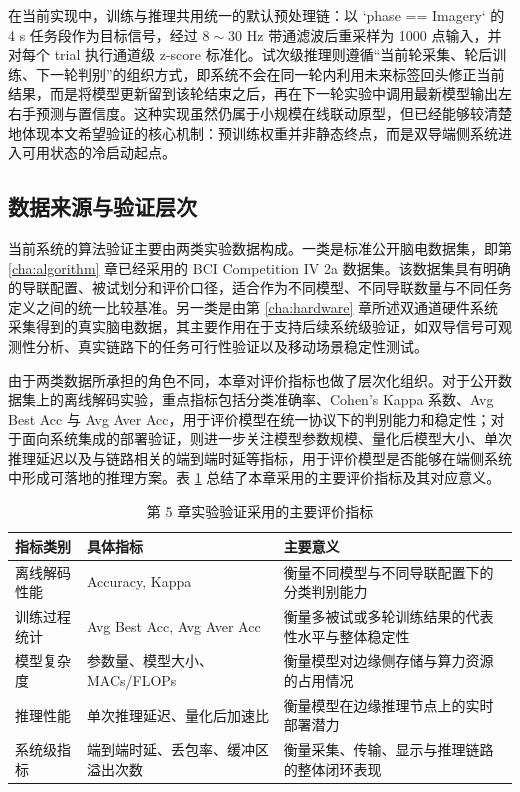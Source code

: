 在当前实现中，训练与推理共用统一的默认预处理链：以 `phase == Imagery` 的 4 s 任务段作为目标信号，经过 $8 \sim 30$ Hz 带通滤波后重采样为 1000 点输入，并对每个 trial 执行通道级 z-score 标准化。试次级推理则遵循“当前轮采集、轮后训练、下一轮判别”的组织方式，即系统不会在同一轮内利用未来标签回头修正当前结果，而是将模型更新留到该轮结束之后，再在下一轮实验中调用最新模型输出左右手预测与置信度。这种实现虽然仍属于小规模在线联动原型，但已经能够较清楚地体现本文希望验证的核心机制：预训练权重并非静态终点，而是双导端侧系统进入可用状态的冷启动起点。

\subsection{数据来源与验证层次}

当前系统的算法验证主要由两类实验数据构成。一类是标准公开脑电数据集，即第 \ref{cha:algorithm} 章已经采用的 BCI Competition IV 2a 数据集。该数据集具有明确的导联配置、被试划分和评价口径，适合作为不同模型、不同导联数量与不同任务定义之间的统一比较基准。另一类是由第 \ref{cha:hardware} 章所述双通道硬件系统采集得到的真实脑电数据，其主要作用在于支持后续系统级验证，如双导信号可观测性分析、真实链路下的任务可行性验证以及移动场景稳定性测试。

由于两类数据所承担的角色不同，本章对评价指标也做了层次化组织。对于公开数据集上的离线解码实验，重点指标包括分类准确率、Cohen's Kappa 系数、Avg Best Acc 与 Avg Aver Acc，用于评价模型在统一协议下的判别能力和稳定性；对于面向系统集成的部署验证，则进一步关注模型参数规模、量化后模型大小、单次推理延迟以及与链路相关的端到端时延等指标，用于评价模型是否能够在端侧系统中形成可落地的推理方案。表 \ref{tab:c5_metrics} 总结了本章采用的主要评价指标及其对应意义。

\begin{table}[htbp]
    \centering
    \caption{第 5 章实验验证采用的主要评价指标}
    \label{tab:c5_metrics}
    \begin{tabular}{p{3.2cm}p{3.0cm}p{6.7cm}}
        \hline
        指标类别 & 具体指标 & 主要意义 \\
        \hline
        离线解码性能 & Accuracy, Kappa & 衡量不同模型与不同导联配置下的分类判别能力 \\
        训练过程统计 & Avg Best Acc, Avg Aver Acc & 衡量多被试或多轮训练结果的代表性水平与整体稳定性 \\
        模型复杂度 & 参数量、模型大小、MACs/FLOPs & 衡量模型对边缘侧存储与算力资源的占用情况 \\
        推理性能 & 单次推理延迟、量化后加速比 & 衡量模型在边缘推理节点上的实时部署潜力 \\
        系统级指标 & 端到端时延、丢包率、缓冲区溢出次数 & 衡量采集、传输、显示与推理链路的整体闭环表现 \\
        \hline
    \end{tabular}
\end{table}

